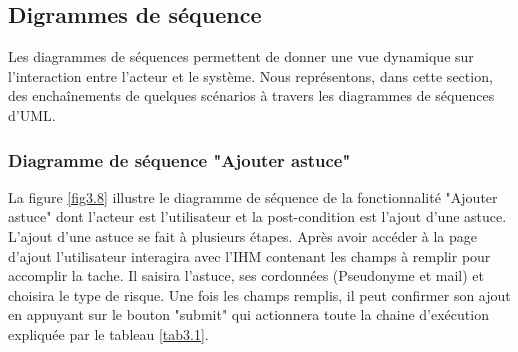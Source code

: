 \subsection{Digrammes de séquence}
\qquad Les diagrammes de séquences permettent de donner une vue dynamique sur l’interaction entre l’acteur et le système. Nous représentons, dans cette section, des enchaînements de quelques scénarios à travers les diagrammes de séquences d’UML.

\subsubsection{Diagramme de séquence "Ajouter astuce"}

\qquad La figure \ref{fig3.8} illustre le diagramme de séquence de la fonctionnalité "Ajouter astuce" dont l'acteur est l'utilisateur et la post-condition est l'ajout d'une astuce. L'ajout d'une astuce se fait à plusieurs étapes. Après avoir accéder à la page d'ajout l'utilisateur interagira avec l'IHM contenant les champs à remplir pour accomplir la tache. Il saisira l'astuce, ses cordonnées (Pseudonyme et mail) et choisira le type de risque. Une fois les champs remplis, il peut confirmer son ajout en appuyant sur le bouton "submit" qui actionnera toute la chaine d'exécution expliquée par le tableau \ref{tab3.1}.


